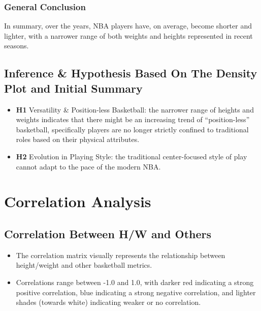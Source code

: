 \documentclass[
]{book}
\providecommand{\tightlist}{%
  \setlength{\itemsep}{0pt}\setlength{\parskip}{0pt}}
\begin{document}
\hypertarget{general-conclusion}{%
\subsection{General Conclusion}\label{general-conclusion}}

In summary, over the years, NBA players have, on average, become shorter and lighter, with a narrower range of both weights and heights represented in recent seasons.

\hypertarget{inference-hypothesis-based-on-the-density-plot-and-initial-summary}{%
\section{Inference \& Hypothesis Based On The Density Plot and Initial Summary}\label{inference-hypothesis-based-on-the-density-plot-and-initial-summary}}

\begin{itemize}
\item
  \textbf{H1} Versatility \& Position-less Basketball: the narrower range of heights and weights indicates that there might be an increasing trend of ``position-less'' basketball, specifically players are no longer strictly confined to traditional roles based on their physical attributes.
\item
  \textbf{H2} Evolution in Playing Style: the traditional center-focused style of play cannot adapt to the pace of the modern NBA.
\end{itemize}

\hypertarget{correlation-analysis}{%
\chapter{Correlation Analysis}\label{correlation-analysis}}

\hypertarget{correlation-between-hw-and-others}{%
\section{Correlation Between H/W and Others}\label{correlation-between-hw-and-others}}

\begin{itemize}
\tightlist
\item
  The correlation matrix visually represents the relationship between height/weight and other basketball metrics.
\item
  Correlations range between -1.0 and 1.0, with darker red indicating a strong positive correlation, blue indicating a strong negative correlation, and lighter shades (towards white) indicating weaker or no correlation.
\end{itemize}
\end{document}
